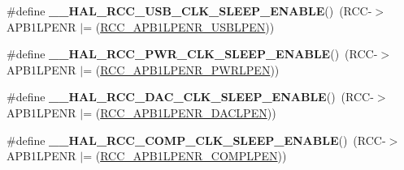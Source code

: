 \begin{DoxyCompactItemize}
\item 
\hypertarget{group___r_c_c___peripheral___clock___sleep___enable___disable_ga96992be78213cf47b37113840179ae2e}{\#define {\bfseries \-\_\-\-\_\-\-H\-A\-L\-\_\-\-R\-C\-C\-\_\-\-U\-S\-B\-\_\-\-C\-L\-K\-\_\-\-S\-L\-E\-E\-P\-\_\-\-E\-N\-A\-B\-L\-E}()~(R\-C\-C-\/$>$A\-P\-B1\-L\-P\-E\-N\-R $\vert$= (\hyperlink{group___peripheral___registers___bits___definition_ga9c068ba6f9554c5b98ddc7c87b658e1e}{R\-C\-C\-\_\-\-A\-P\-B1\-L\-P\-E\-N\-R\-\_\-\-U\-S\-B\-L\-P\-E\-N}))}\label{group___r_c_c___peripheral___clock___sleep___enable___disable_ga96992be78213cf47b37113840179ae2e}

\item 
\hypertarget{group___r_c_c___peripheral___clock___sleep___enable___disable_gacad9c9770ee2525fccf6a15e4ee7a07a}{\#define {\bfseries \-\_\-\-\_\-\-H\-A\-L\-\_\-\-R\-C\-C\-\_\-\-P\-W\-R\-\_\-\-C\-L\-K\-\_\-\-S\-L\-E\-E\-P\-\_\-\-E\-N\-A\-B\-L\-E}()~(R\-C\-C-\/$>$A\-P\-B1\-L\-P\-E\-N\-R $\vert$= (\hyperlink{group___peripheral___registers___bits___definition_ga274fa282ad1ff40b747644bf9360feb4}{R\-C\-C\-\_\-\-A\-P\-B1\-L\-P\-E\-N\-R\-\_\-\-P\-W\-R\-L\-P\-E\-N}))}\label{group___r_c_c___peripheral___clock___sleep___enable___disable_gacad9c9770ee2525fccf6a15e4ee7a07a}

\item 
\hypertarget{group___r_c_c___peripheral___clock___sleep___enable___disable_gad50feef6d1bdd1d254d96ce2786a502b}{\#define {\bfseries \-\_\-\-\_\-\-H\-A\-L\-\_\-\-R\-C\-C\-\_\-\-D\-A\-C\-\_\-\-C\-L\-K\-\_\-\-S\-L\-E\-E\-P\-\_\-\-E\-N\-A\-B\-L\-E}()~(R\-C\-C-\/$>$A\-P\-B1\-L\-P\-E\-N\-R $\vert$= (\hyperlink{group___peripheral___registers___bits___definition_gaf36a11e89644548702385d548f3f9ec4}{R\-C\-C\-\_\-\-A\-P\-B1\-L\-P\-E\-N\-R\-\_\-\-D\-A\-C\-L\-P\-E\-N}))}\label{group___r_c_c___peripheral___clock___sleep___enable___disable_gad50feef6d1bdd1d254d96ce2786a502b}

\item 
\hypertarget{group___r_c_c___peripheral___clock___sleep___enable___disable_ga341a7cb88414db0777196d6d772fb4be}{\#define {\bfseries \-\_\-\-\_\-\-H\-A\-L\-\_\-\-R\-C\-C\-\_\-\-C\-O\-M\-P\-\_\-\-C\-L\-K\-\_\-\-S\-L\-E\-E\-P\-\_\-\-E\-N\-A\-B\-L\-E}()~(R\-C\-C-\/$>$A\-P\-B1\-L\-P\-E\-N\-R $\vert$= (\hyperlink{group___peripheral___registers___bits___definition_gae6751f8c4511c642d6086b356f325a63}{R\-C\-C\-\_\-\-A\-P\-B1\-L\-P\-E\-N\-R\-\_\-\-C\-O\-M\-P\-L\-P\-E\-N}))}\label{group___r_c_c___peripheral___clock___sleep___enable___disable_ga341a7cb88414db0777196d6d772fb4be}


\end{DoxyCompactItemize}
